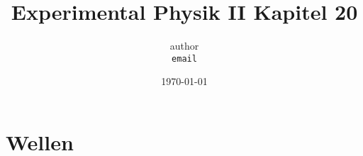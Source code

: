 \documentclass[11pt]{article}
\begin{document}
	\title{Experimental Physik II Kapitel 20}
		\author
			{
				author\\
				{\small 	\texttt{email}}
			}
		\date{\today}
	\maketitle
	\tableofcontents
	\setcounter{section}{19} %
	\newpage
	
	\section{Wellen}
	
	
\end{document}
